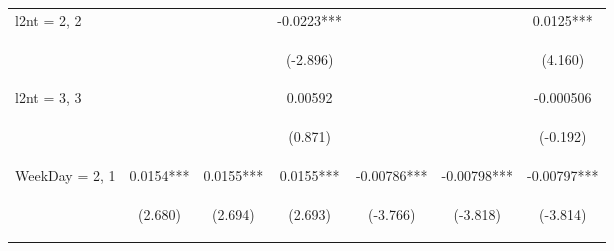 \documentclass[]{article}
\begin{document}
\begin{center}
\begin{tabular}{lcccccc}
l2nt = 2, 2 &  &  & -0.0223*** &  &  & 0.0125*** \\
\vspace{4pt} & \begin{footnotesize}\end{footnotesize} & \begin{footnotesize}\end{footnotesize} & \begin{footnotesize}(-2.896)\end{footnotesize} & \begin{footnotesize}\end{footnotesize} & \begin{footnotesize}\end{footnotesize} & \begin{footnotesize}(4.160)\end{footnotesize} \\
l2nt = 3, 3 &  &  & 0.00592 &  &  & -0.000506 \\
\vspace{4pt} & \begin{footnotesize}\end{footnotesize} & \begin{footnotesize}\end{footnotesize} & \begin{footnotesize}(0.871)\end{footnotesize} & \begin{footnotesize}\end{footnotesize} & \begin{footnotesize}\end{footnotesize} & \begin{footnotesize}(-0.192)\end{footnotesize} \\
WeekDay = 2, 1 & 0.0154*** & 0.0155*** & 0.0155*** & -0.00786*** & -0.00798*** & -0.00797*** \\
\vspace{4pt} & \begin{footnotesize}(2.680)\end{footnotesize} & \begin{footnotesize}(2.694)\end{footnotesize} & \begin{footnotesize}(2.693)\end{footnotesize} & \begin{footnotesize}(-3.766)\end{footnotesize} & \begin{footnotesize}(-3.818)\end{footnotesize} & \begin{footnotesize}(-3.814)\end{footnotesize} \\

\end{tabular}
\end{center}
\end{document}
